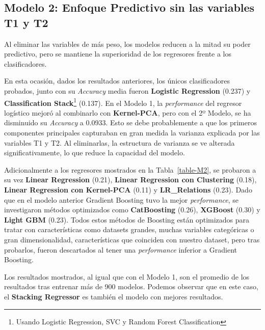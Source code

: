 \documentclass{article}
\begin{document}
\subsection{Modelo 2: Enfoque Predictivo sin las variables T1 y T2}

Al eliminar las variables de más peso, los modelos reducen a la mitad su poder predictivo, pero se mantiene la superioridad de los regresores frente a los clasificadores.

En esta ocasión, dados los resultados anteriores, los únicos clasificadores probados, junto con su \textit{Accuracy} media fueron \textbf{Logistic Regression} (0.237) y \textbf{Classification Stack}\footnote{Usando Logistic Regression, SVC y Random Forest Classification} (0.137).
En el Modelo 1, la \textit{performance} del regresor logístico mejoró al combinarlo con \textbf{Kernel-PCA}, pero con el 2º Modelo, se ha disminuido su \textit{Accuracy} a 0.0933. Esto se debe probablemente a que los primeros componentes principales capturaban en gran medida la varianza explicada 
por las variables T1 y T2. Al eliminarlas, la estructura de varianza se ve alterada significativamente, lo que reduce la capacidad del modelo.

Adicionalmente a los regresores mostrados en la Tabla~\ref{table-M2}, se probaron a su vez \textbf{Linear Regression} (0.21), \textbf{Linear Regression con Clustering} (0.18), \textbf{Linear Regression con Kernel-PCA} (0.11) y \textbf{LR\_Relations} (0.23). Dado que 
en el modelo anterior Gradient Boosting tuvo la mejor \textit{performance}, se investigaron métodos optimizados como \textbf{CatBoosting} (0.26), \textbf{XGBoost} (0.30) y \textbf{Light GBM} (0.23). Todos estos métodos de Boosting 
están optimizados para tratar con características como datasets grandes, muchas variables categóricas o gran dimensionalidad, características que coinciden con nuestro dataset, pero tras probarlos, fueron descartados al tener una \textit{performance} inferior a Gradient Boosting.

Los resultados mostrados, al igual que con el Modelo 1, son el promedio de los resultados tras entrenar más de 900 modelos.
Podemos observar que en este caso, el \textbf{Stacking Regressor} es también el modelo con mejores resultados.
\end{document}
